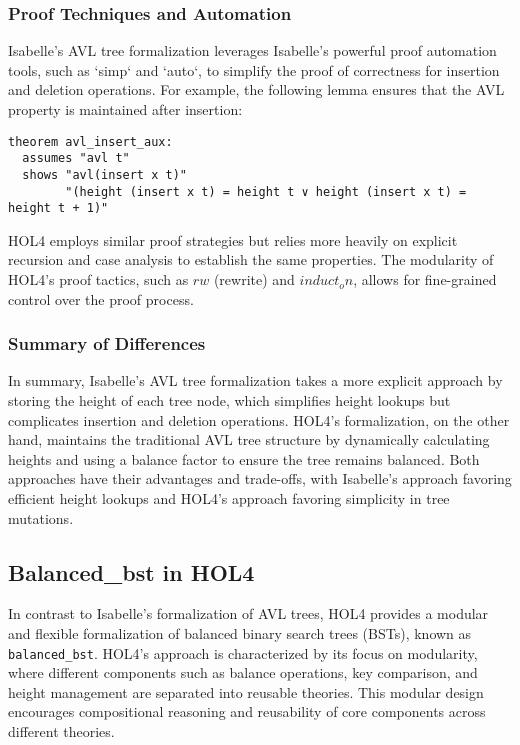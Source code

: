 \documentclass[12pt]{article}
\begin{document}
\subsubsection{Proof Techniques and Automation}
Isabelle’s AVL tree formalization leverages Isabelle’s powerful proof automation tools, such as `simp` and `auto`, to simplify the proof of correctness for insertion and deletion operations. For example, the following lemma ensures that the AVL property is maintained after insertion:

\begin{verbatim}
theorem avl_insert_aux:
  assumes "avl t"
  shows "avl(insert x t)"
        "(height (insert x t) = height t ∨ height (insert x t) = height t + 1)"
\end{verbatim}

HOL4 employs similar proof strategies but relies more heavily on explicit recursion and case analysis to establish the same properties. The modularity of HOL4’s proof tactics, such as \(rw\) (rewrite) and \(induct_on\), allows for fine-grained control over the proof process.

\subsubsection{Summary of Differences}
In summary, Isabelle’s AVL tree formalization takes a more explicit approach by storing the height of each tree node, which simplifies height lookups but complicates insertion and deletion operations. HOL4’s formalization, on the other hand, maintains the traditional AVL tree structure by dynamically calculating heights and using a balance factor to ensure the tree remains balanced. Both approaches have their advantages and trade-offs, with Isabelle’s approach favoring efficient height lookups and HOL4’s approach favoring simplicity in tree mutations.

\subsection{Balanced\_bst in HOL4}

In contrast to Isabelle’s formalization of AVL trees, HOL4 \cite{HOLBalancedBST} provides a modular and flexible formalization of balanced binary search trees (BSTs), known as \texttt{balanced\_bst}. HOL4's approach is characterized by its focus on modularity, where different components such as balance operations, key comparison, and height management are separated into reusable theories. This modular design encourages compositional reasoning and reusability of core components across different theories.
\end{document}
